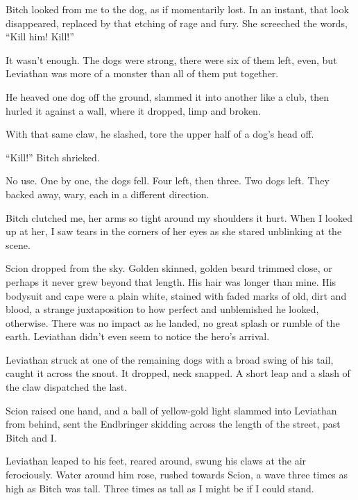Bitch looked from me to the dog, as if momentarily lost.  In an instant, that look disappeared, replaced by that etching of rage and fury.  She screeched the words, ``Kill him!  Kill!''



It wasn't enough.  The dogs were strong, there were six of them left, even, but Leviathan was more of a monster than all of them put together.



He heaved one dog off the ground, slammed it into another like a club, then hurled it against a wall, where it dropped, limp and broken.



With that same claw, he slashed, tore the upper half of a dog's head off.



``Kill!'' Bitch shrieked.



No use.  One by one, the dogs fell.  Four left, then three.  Two dogs left.  They backed away, wary, each in a different direction.



Bitch clutched me, her arms so tight around my shoulders it hurt.  When I looked up at her, I saw tears in the corners of her eyes as she stared unblinking at the scene.



Scion dropped from the sky.  Golden skinned, golden beard trimmed close, or perhaps it never grew beyond that length.  His hair was longer than mine.  His bodysuit and cape were a plain white, stained with faded marks of old, dirt and blood, a strange juxtaposition to how perfect and unblemished he looked, otherwise.  There was no impact as he landed, no great splash or rumble of the earth.  Leviathan didn't even seem to notice the hero's arrival.



Leviathan struck at one of the remaining dogs with a broad swing of his tail, caught it across the snout.  It dropped, neck snapped.  A short leap and a slash of the claw dispatched the last.



Scion raised one hand, and a ball of yellow-gold light slammed into Leviathan from behind, sent the Endbringer skidding across the length of the street, past Bitch and I.



Leviathan leaped to his feet, reared around, swung his claws at the air ferociously.  Water around him rose, rushed towards Scion, a wave three times as high as Bitch was tall.  Three times as tall as I might be if I could stand.



